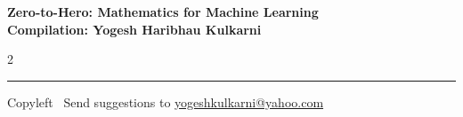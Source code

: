 \documentclass[8pt,landscape]{article}
\begin{document}
\footnotesize


\begin{center}
\Large{\textbf{Zero-to-Hero: Mathematics for Machine Learning\\ Compilation: Yogesh Haribhau Kulkarni}}  
\end{center}

\begin{multicols}{2}

\end{multicols}

\rule{\linewidth}{0.25pt}
\scriptsize
Copyleft \textcopyleft\  Send suggestions to 
\href{http://www.yogeshkulkarni.com}{yogeshkulkarni@yahoo.com}
\end{document}
